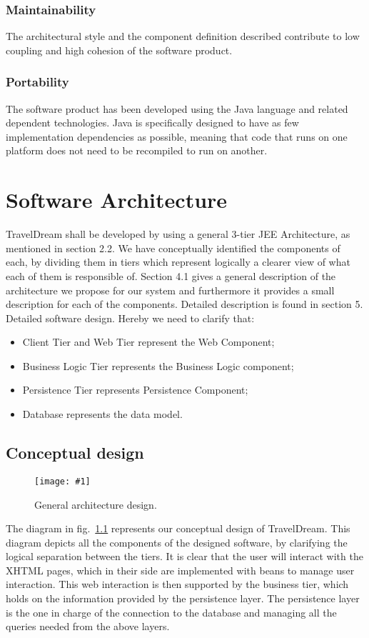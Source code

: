 \documentclass[a4paper,12pt]{book}
\newcommand{\insimg}[3]{
  \begin{figure}[H]
    \begin{center}
      \texttt{[image: \#1]}
    \end{center}
    \caption{#2}
    \label{fig:#1}
  \end{figure}
}
\begin{document}
\subsection{Maintainability}
The architectural style and the component definition described contribute to low coupling and high cohesion of the software product.

\subsection{Portability}
The software product has been developed using the Java language and related dependent technologies. Java is specifically designed to have as few implementation dependencies as possible, meaning that code that runs on one platform does not need to be recompiled to run on another.

\chapter{Software Architecture}
TravelDream shall be developed by using a general 3-tier JEE Architecture, as mentioned in section 2.2. We have conceptually identified the components of each, by dividing them in tiers which represent logically a clearer view of what each of them is responsible of. Section 4.1 gives a general description of the architecture we propose for our system and furthermore it provides a small description for each of the components. Detailed description is found in section 5. Detailed software design. Hereby we need to clarify that:
\begin{itemize}
  \item Client Tier and Web Tier represent the Web Component;
  \item Business Logic Tier represents the Business Logic component;
  \item Persistence Tier represents Persistence Component;
  \item Database represents the data model.
\end{itemize}

\section{Conceptual design}
\insimg{architecture}{General architecture design.}{0.3}

The diagram in fig.~\ref{fig:architecture} represents our conceptual design of TravelDream. This diagram depicts all the components of the designed software, by clarifying the logical separation between the tiers. It is clear that the user will interact with the XHTML pages, which in their side are implemented with beans to manage user interaction. This web interaction is then supported by the business tier, which holds on the information provided by the persistence layer. The persistence layer is the one in charge of the connection to the database and managing all the queries needed from the above layers.
\end{document}
